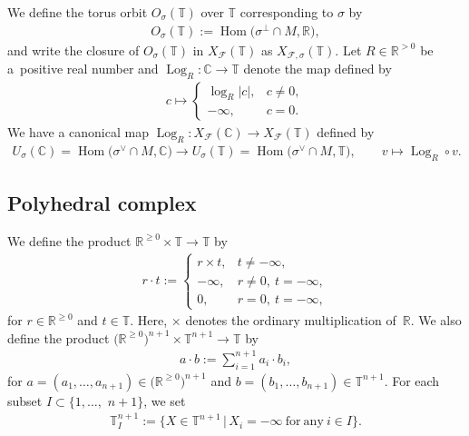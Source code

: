 \documentclass[pdftex]{sigma}
\numberwithin{equation}{section}
\begin{document}
We def\/ine the torus orbit $O_\sigma({\mathbb T})$ over ${\mathbb T}$ corresponding to $\sigma$ by
\begin{gather*}
O_\sigma({\mathbb T}):=\operatorname{Hom}\big(\sigma^\perp \cap M,{\mathbb R}\big),
\end{gather*}
and write the closure of $O_\sigma({\mathbb T})$ in $X_{\mathcal F}({\mathbb T})$ as $X_{{\mathcal F},\sigma}({\mathbb T})$. Let $R \in {\mathbb R}^{>0}$ be a~positive real number and $\operatorname{Log}_R \colon {\mathbb C} \to {\mathbb T}$ denote the map def\/ined by
\begin{gather*}
c \mapsto \begin{cases}
\log_R|c|, & c \neq 0, \\
 -\infty, & c=0.
\end{cases}
\end{gather*}
We have a canonical map $\operatorname{Log}_R \colon X_{\mathcal F}({\mathbb C}) \to X_{\mathcal F}({\mathbb T})$ def\/ined by
\begin{gather}\label{eq:log}
U_\sigma({\mathbb C})=\operatorname{Hom}\big(\sigma^\vee \cap M, {\mathbb C}\big) \to U_\sigma({\mathbb T})=\operatorname{Hom}\big(\sigma^\vee \cap M, {\mathbb T}\big),\qquad v \mapsto \operatorname{Log}_R \circ v.
\end{gather}

\subsection{Polyhedral complex}

We def\/ine the product ${\mathbb R}^{\geq0} \times {\mathbb T} \to {\mathbb T}$ by
\begin{gather*}
r \cdot t := \begin{cases}
r \times t, & t \neq -\infty, \\
-\infty, & r \neq 0, \ t=-\infty, \\
0, & r=0, \ t=-\infty,
\end{cases}
\end{gather*}
for $r \in {\mathbb R}^{\geq 0}$ and $t \in {\mathbb T}$. Here, $\times$ denotes the ordinary multiplication of~${\mathbb R}$. We also def\/ine the product $\big({\mathbb R}^{\geq0}\big)^{n+1} \times {\mathbb T}^{n+1} \to {\mathbb T}$ by
\begin{gather*}
a \cdot b :=\sum_{i=1}^{n+1} a_i \cdot b_i,
\end{gather*}
for $a=(a_1, \dots, a_{n+1}) \in \big({\mathbb R}^{\geq0}\big)^{n+1}$ and $b=(b_1, \dots, b_{n+1}) \in {\mathbb T}^{n+1}$. For each subset $I \subset \{1, \dots,$ $n+1 \}$, we set
\begin{gather*}
{\mathbb T}_{I}^{n+1}:= \big\{ X \in {\mathbb T}^{n+1} \,|\, X_i = -\infty \ \mathrm{for\ any\ } i \in I \big\}.
\end{gather*}
\end{document}
